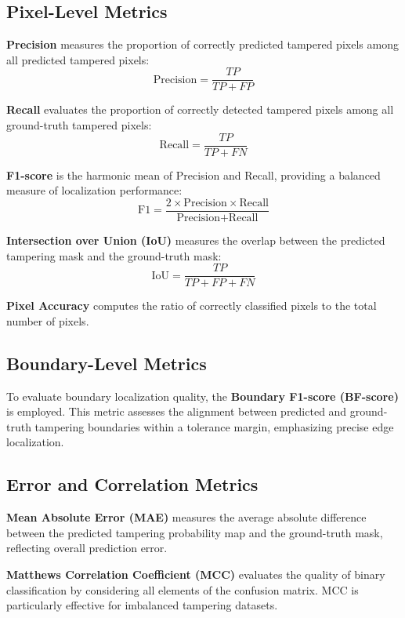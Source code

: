 \documentclass[runningheads]{llncs}
\begin{document}
\subsection{Pixel-Level Metrics}

\noindent\textbf{Precision} measures the proportion of correctly predicted tampered pixels among all predicted tampered pixels:
\[
\text{Precision} = \frac{TP}{TP + FP}
\]

\noindent\textbf{Recall} evaluates the proportion of correctly detected tampered pixels among all ground-truth tampered pixels:
\[
\text{Recall} = \frac{TP}{TP + FN}
\]

\noindent\textbf{F1-score} is the harmonic mean of Precision and Recall, providing a balanced measure of localization performance:
\[
\text{F1} = \frac{2 \times \text{Precision} \times \text{Recall}}{\text{Precision} + \text{Recall}}
\]

\noindent\textbf{Intersection over Union (IoU)} measures the overlap between the predicted tampering mask and the ground-truth mask:
\[
\text{IoU} = \frac{TP}{TP + FP + FN}
\]

\noindent\textbf{Pixel Accuracy} computes the ratio of correctly classified pixels to the total number of pixels.

\subsection{Boundary-Level Metrics}

To evaluate boundary localization quality, the \textbf{Boundary F1-score (BF-score)} is employed. This metric assesses the alignment between predicted and ground-truth tampering boundaries within a tolerance margin, emphasizing precise edge localization.

\subsection{Error and Correlation Metrics}

\noindent\textbf{Mean Absolute Error (MAE)} measures the average absolute difference between the predicted tampering probability map and the ground-truth mask, reflecting overall prediction error.

\vspace{0.5em}

\noindent\textbf{Matthews Correlation Coefficient (MCC)} evaluates the quality of binary classification by considering all elements of the confusion matrix. MCC is particularly effective for imbalanced tampering datasets.
\end{document}
